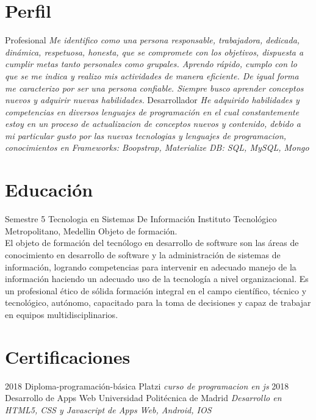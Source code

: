\documentclass[]{friggeri-cv}
\begin{document}
\section{Perfil}
\begin{entrylist}
  \entry
    {}
    {Profesional \vspace{\baselineskip}}
    {  }
    {\emph{Me identifico como una persona responsable, trabajadora, dedicada, dinámica, respetuosa, honesta, que se compromete con los objetivos, dispuesta a cumplir metas tanto personales como grupales. Aprendo rápido, cumplo con lo que se me indica y realizo mis actividades de manera eficiente. De igual forma me caracterizo por ser una persona confiable. Siempre busco aprender conceptos nuevos y adquirir nuevas habilidades.\vspace{\baselineskip}
}}
  \entry
    {  }
    {Desarrollador \vspace{\baselineskip}}
    { }
    {\emph{He adquirido habilidades y competencias en diversos lenguajes de programación en el cual constantemente estoy en un proceso de actualizacion de conceptos nuevos y contenido, debido a mi particular gusto por las nuevas tecnologias y lenguajes de programacion,
    \\conocimientos en 
    Frameworks: Boopstrap, Materialize
    DB: SQL, MySQL, Mongo
}}
  
\end{entrylist}
\section{Educación}
\begin{entrylist}
  \entry
    {Semestre 5}
    {Tecnologia en Sistemas De Información}
    {Instituto Tecnológico Metropolitano, Medellin}
    {Objeto de formación.\\
    El objeto de formación del tecnólogo en desarrollo de software son las áreas de conocimiento en desarrollo de software y la administración de sistemas de información, logrando competencias para intervenir en adecuado manejo de la información haciendo un adecuado uso de la tecnología a nivel organizacional. Es un profesional ético de sólida formación integral en el campo científico, técnico y tecnológico, autónomo, capacitado para la toma de decisiones y capaz de trabajar en equipos multidisciplinarios.\\}
\end{entrylist}

\section{Certificaciones}
\begin{entrylist}
  \entry
    {2018}
    {Diploma-programación-básica}
    {Platzi}
    {\emph{curso de programacion en js }}
     \entry
    {2018}
    {Desarrollo de Apps Web}
    {Universidad Politécnica de Madrid}
    {\emph{Desarrollo en HTML5, CSS y Javascript de Apps Web, Android, IOS}}
\end{entrylist}
\end{document}
